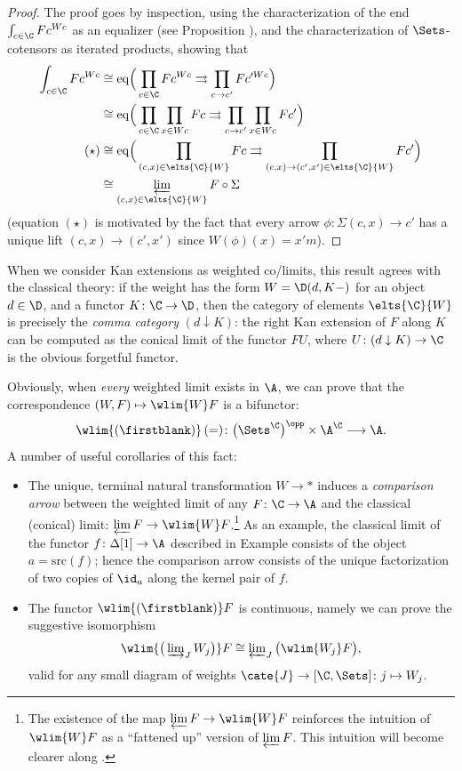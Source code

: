 \begin{proof}
The proof goes by inspection, using the characterization of the end $\int_{c\in \C}Fc^{Wc} $ as an equalizer (see Proposition ), and the characterization of $\Sets$-cotensors as iterated products, showing that 
\begin{align*}
\int_{c\in \C}Fc^{Wc} &\cong {\rm eq}\Big(  \prod_{c\in \C}Fc^{Wc}\rightrightarrows \prod_{c\to c'}Fc'^{Wc}\Big)\\
&\cong {\rm eq}\Big( \prod_{c\in\C}\prod_{x\in Wc} Fc\rightrightarrows \prod_{c\to c'}\prod_{x\in Wc}Fc' \Big)\\
(\star) &\cong {\rm eq}\Big( \prod_{(c,x)\in \elts{\C}{W}} Fc\rightrightarrows \prod_{(c,x)\to (c',x')\in \elts{\C}{W}} Fc' \Big)\\
&\cong \varprojlim_{(c,x)\in\elts{\C}{W}} F\circ \Sigma 
\end{align*}
(equation $(\star)$ is motivated by the fact that every arrow $\phi \colon \Sigma(c,x)\to c'$ has a unique lift $(c,x)\to (c', x')$ since $W(\phi)(x) = x'm$).
\end{proof}
\begin{remark}
When we consider Kan extensions as weighted co/limits, this result agrees with the classical theory: if the weight has the form $W=\D(d,K-)$ for an object $d\in\D$, and a functor $K\colon \C\to\D$, then the category of elements $\elts{\C}{W}$ is precisely the \emph{comma category} $(d\downarrow K)$: the right Kan extension of $F$ along $K$ can be computed as the conical limit of the functor $FU$, where $U\colon (d\downarrow K)\to \C$ is the obvious forgetful functor.
\end{remark}
Obviously, when \emph{every} weighted limit exists in $\A$, we can prove that the correspondence $(W,F) \mapsto\wlim{W}F$ is a bifunctor:
\[
\wlim{(\firstblank)}\,(=)\colon \big(\Sets^\C \big)^\opp\times \A^\C\longrightarrow \A.
\] A number of useful corollaries of this fact:
\begin{itemize}
\item The unique, terminal natural transformation $W\to *$ induces a \emph{comparison arrow} between the weighted limit of any $F\colon\C\to\A$ and the classical (conical) limit: $\varprojlim F\to \wlim{W}F$.\footnote{The existence of the map $\varprojlim F\to \wlim{W}F$ reinforces the intuition of $\wlim{W}F$ as a ``fattened up'' version of $\varprojlim F$. This intuition will become clearer along .} As an example, the classical limit of the functor $f\colon \Delta[1]\to \A$ described in Example  consists of the object $a = \text{src}(f)$; hence the comparison arrow consists of the unique factorization of two copies of $\id_a$ along the kernel pair of $f$.
\item The functor $\wlim{(\firstblank)}F$ is continuous, namely we can prove the suggestive isomorphism
\[\textstyle\label{wlimcocont} 
\wlim{\big(\varinjlim_J W_j\big)}F\cong \varprojlim_J \big(\wlim{W_j}F\big),
\]
valid for any small diagram of weights $\cate{J}\to [\C, \Sets]\colon j\mapsto W_j$.
\end{itemize}
